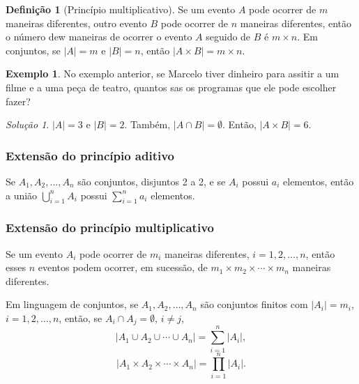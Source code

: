 \documentclass[]{book}
\theoremstyle{definition}
\newtheorem{definition}{Definição}[chapter]
\theoremstyle{definition}
\newtheorem{example}{Exemplo}[chapter]
\theoremstyle{definition}
\theoremstyle{remark}
\newtheorem*{solution}{Solução}
\begin{document}
\begin{definition}[Princípio multiplicativo]
\protect\hypertarget{def:defMultiplicativo}{}{\label{def:defMultiplicativo} \iffalse (Princípio multiplicativo) \fi{} }Se um evento \(A\) pode ocorrer de \(m\) maneiras diferentes, outro evento \(B\) pode ocorrer de \(n\) maneiras diferentes, então o número dew maneiras de ocorrer o evento \(A\) seguido de \(B\) é \(m\times n\).
Em conjuntos, se \(|A|=m\) e \(|B|=n\), então \(|A\times B| = m \times n\).
\end{definition}

\begin{example}
\protect\hypertarget{exm:unnamed-chunk-18}{}{\label{exm:unnamed-chunk-18} }No exemplo anterior, se Marcelo tiver dinheiro para assitir a um filme e a uma peça de teatro, quantos sas os programas que ele pode escolher fazer?
\end{example}

\begin{solution}
\iffalse{} {Solução. } \fi{}\(|A|=3\) e \(|B|=2\).
Também, \(|A\cap B| = \emptyset\).
Então, \(|A \times B| = 6.\)
\end{solution}

\hypertarget{extensuxe3o-do-princuxedpio-aditivo}{%
\subsubsection*{Extensão do princípio aditivo}\label{extensuxe3o-do-princuxedpio-aditivo}}

Se \(A_1, A_2, \ldots, A_n\) são conjuntos, disjuntos 2 a 2, e se \(A_i\) possui \(a_i\) elementos, então a união \(\bigcup_{i=1}^{n}A_i\) possui \(\sum_{i=1}^{n}a_i\) elementos.

\hypertarget{extensuxe3o-do-princuxedpio-multiplicativo}{%
\subsubsection*{Extensão do princípio multiplicativo}\label{extensuxe3o-do-princuxedpio-multiplicativo}}

Se um evento \(A_i\) pode ocorrer de \(m_i\) maneiras diferentes, \(i = 1,2,\ldots, n\), então esses \(n\) eventos podem ocorrer, em sucessão, de \(m_1 \times m_2 \times \cdots \times m_n\) maneiras diferentes.

Em linguagem de conjuntos, se \(A_1, A_2, \ldots, A_n\) são conjuntos finitos com \(|A_i|=m_i\), \(i = 1,2,\ldots, n\), então, se \(A_i \cap A_j = \emptyset\), \(i \neq j\),
\[ |A_1 \cup A_2 \cup \cdots \cup A_n| =  \sum_{i=1}^{n}|A_i|,\]
\[ |A_1 \times A_2 \times \cdots \times A_n| =  \prod_{i=1}^{n}|A_i|.\]
\end{document}
